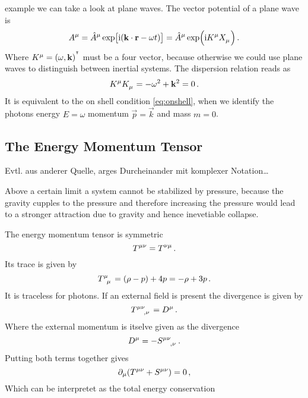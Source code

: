 example we can take a look at plane waves. The vector potential of a plane wave is
\begin{equation}
    \tensor{A}{^\mu}=\tensor{\hat{A}}{^\mu}
    \exp\left[\imI(\vec{k}\cdot\vec{r}-\omega
    t)\right]
    =\tensor{\hat{A}}{^\mu}\exp\left(\imI\tensor{K}{^\mu} \tensor{X}{_\mu}\right)\,
    .
\end{equation}
Where $\tensor{K}{^\mu}=\left(\omega,\vec{k}\right)\transpose$ must be a four
vector, because otherwise we could use plane waves to distinguish between
inertial systems. The dispersion relation reads as
\begin{equation}
    \tensor{K}{^\mu}\tensor{K}{_\mu}=-\omega^2+\vec{k}^2=0\, .
\end{equation}
It is equivalent to the on shell condition \eqref{eq:onshell}, when we identify
the photons energy $E=\omega$ momentum $\vec{p}=\vec{k}$ and mass $m=0$.
\subsection{The Energy Momentum Tensor}
Evtl. aus anderer Quelle, arges Durcheinander mit komplexer Notation\ldots
\begin{sidenote}
Above a certain limit a system cannot be stabilized by pressure, because the
gravity cupples to the pressure and therefore increasing the pressure would lead
to a stronger attraction due to gravity and hence inevetiable collapse.
\end{sidenote}
The energy momentum tensor is symmetric
\begin{equation}
    \tensor{T}{^\mu^\nu}=\tensor{T}{^\nu^\mu}\, .
\end{equation}
Its trace is given by
\begin{equation}
    \tensor{T}{^\mu_\mu}=(\rho-p)+4p=-\rho+3p\, .
\end{equation}
It is traceless for photons. If an external field is present the divergence is
given by
\begin{equation}
    \tensor{T}{^\mu^\nu_,_\nu}=\tensor{D}{^\mu}\,  .
\end{equation}
Where the external momentum is itselve given as the divergence
\begin{equation}
    \tensor{D}{^\mu} =-\tensor{S}{^\mu^\nu_,_\nu}\, .
\end{equation}
Putting both terms together gives
\begin{equation}
    \partial_\mu(\tensor{T}{^\mu^\nu}+\tensor{S}{^\mu^\nu})=0\,,
\end{equation}
Which can be interpretet as the total energy conservation
